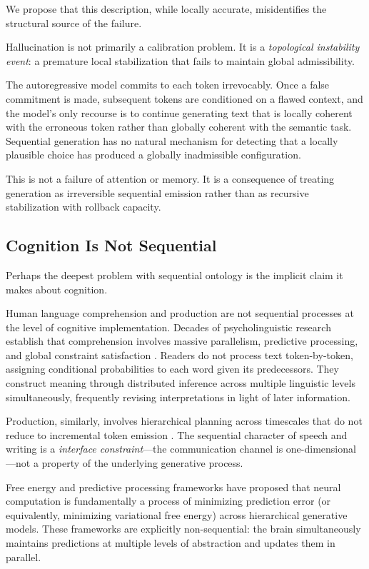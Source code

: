 \documentclass[11pt, a4paper]{article}
\theoremstyle{srn}
\theoremstyle{srnremark}
\begin{document}
We propose that this description, while locally accurate, misidentifies
the structural source of the failure.

Hallucination is not primarily a calibration problem.
It is a \emph{topological instability event}: a premature local
stabilization that fails to maintain global admissibility.

The autoregressive model commits to each token irrevocably.
Once a false commitment is made, subsequent tokens are conditioned on
a flawed context, and the model's only recourse is to continue
generating text that is locally coherent with the erroneous token
rather than globally coherent with the semantic task.
Sequential generation has no natural mechanism for detecting that a
locally plausible choice has produced a globally inadmissible
configuration.

This is not a failure of attention or memory.
It is a consequence of treating generation as irreversible sequential
emission rather than as recursive stabilization with rollback capacity.

\subsection{Cognition Is Not Sequential}

Perhaps the deepest problem with sequential ontology is the implicit
claim it makes about cognition.

Human language comprehension and production are not sequential
processes at the level of cognitive implementation.
Decades of psycholinguistic research establish that comprehension
involves massive parallelism, predictive processing, and global
constraint satisfaction \citep{pearl1988probabilistic}.
Readers do not process text token-by-token, assigning conditional
probabilities to each word given its predecessors.
They construct meaning through distributed inference across multiple
linguistic levels simultaneously, frequently revising interpretations
in light of later information.

Production, similarly, involves hierarchical planning across timescales
that do not reduce to incremental token emission
\citep{smolensky1986harmony, hinton1983optimal}.
The sequential character of speech and writing is a \emph{interface
constraint}---the communication channel is one-dimensional---not a
property of the underlying generative process.

Free energy and predictive processing frameworks
\citep{friston2010free, friston2006free} have proposed that neural
computation is fundamentally a process of minimizing prediction error
(or equivalently, minimizing variational free energy) across hierarchical
generative models.
These frameworks are explicitly non-sequential: the brain simultaneously
maintains predictions at multiple levels of abstraction and updates them
in parallel.
\end{document}
